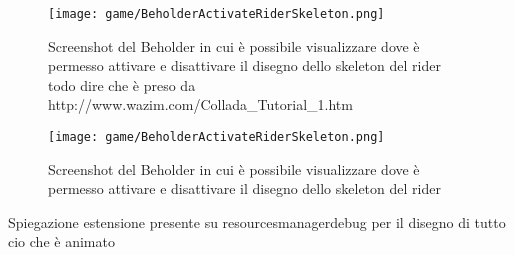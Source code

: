 	\begin{figure}[h!] 
		\centering 
		\hspace*{-0.05\columnwidth}\texttt{[image: game/BeholderActivateRiderSkeleton.png]} 
		\caption{Screenshot del Beholder in cui è possibile visualizzare dove è permesso attivare e disattivare il disegno dello skeleton del rider todo dire che è preso da http://www.wazim.com/Collada\_Tutorial\_1.htm}
	\end{figure}
	
	\begin{figure}[h!] 
		\centering 
		\hspace*{-0.05\columnwidth}\texttt{[image: game/BeholderActivateRiderSkeleton.png]} 
		\caption{Screenshot del Beholder in cui è possibile visualizzare dove è permesso attivare e disattivare il disegno dello skeleton del rider}
	\end{figure}
	
	Spiegazione estensione presente su resourcesmanagerdebug per il disegno di tutto cio che è animato